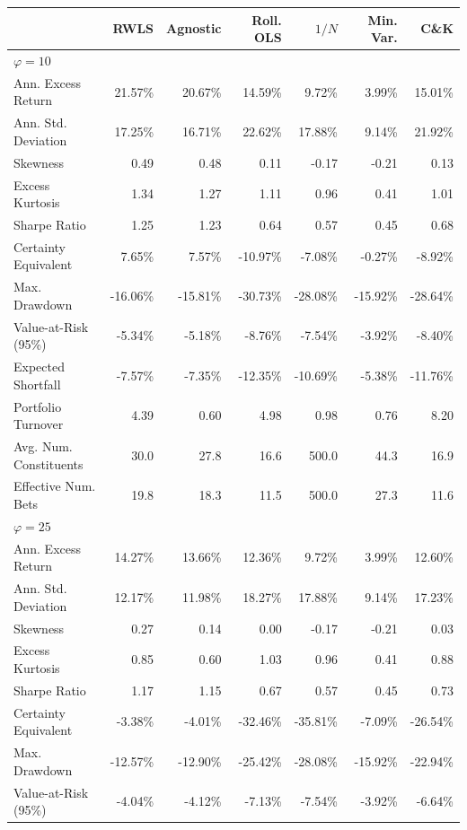 \begin{tabular*}{\textwidth}{l@{\extracolsep{\fill}}rrrrrr}
\toprule
 & RWLS & Agnostic & Roll. OLS & $1/N$ & Min. Var. & C\&K \\
\midrule
\multicolumn{7}{l}{\textit{$\varphi = 10$}} \\
\midrule
Ann. Excess Return & 21.57\% & 20.67\% & 14.59\% & 9.72\% & 3.99\% & 15.01\% \\
Ann. Std. Deviation & 17.25\% & 16.71\% & 22.62\% & 17.88\% & 9.14\% & 21.92\% \\
Skewness & 0.49 & 0.48 & 0.11 & -0.17 & -0.21 & 0.13 \\
Excess Kurtosis & 1.34 & 1.27 & 1.11 & 0.96 & 0.41 & 1.01 \\
Sharpe Ratio & 1.25 & 1.23 & 0.64 & 0.57 & 0.45 & 0.68 \\
Certainty Equivalent & 7.65\% & 7.57\% & -10.97\% & -7.08\% & -0.27\% & -8.92\% \\
Max. Drawdown & -16.06\% & -15.81\% & -30.73\% & -28.08\% & -15.92\% & -28.64\% \\
Value-at-Risk (95\%) & -5.34\% & -5.18\% & -8.76\% & -7.54\% & -3.92\% & -8.40\% \\
Expected Shortfall & -7.57\% & -7.35\% & -12.35\% & -10.69\% & -5.38\% & -11.76\% \\
Portfolio Turnover & 4.39 & 0.60 & 4.98 & 0.98 & 0.76 & 8.20 \\
Avg. Num. Constituents & 30.0 & 27.8 & 16.6 & 500.0 & 44.3 & 16.9 \\
Effective Num. Bets & 19.8 & 18.3 & 11.5 & 500.0 & 27.3 & 11.6 \\
\midrule
\multicolumn{7}{l}{\textit{$\varphi = 25$}} \\
\midrule
Ann. Excess Return & 14.27\% & 13.66\% & 12.36\% & 9.72\% & 3.99\% & 12.60\% \\
Ann. Std. Deviation & 12.17\% & 11.98\% & 18.27\% & 17.88\% & 9.14\% & 17.23\% \\
Skewness & 0.27 & 0.14 & 0.00 & -0.17 & -0.21 & 0.03 \\
Excess Kurtosis & 0.85 & 0.60 & 1.03 & 0.96 & 0.41 & 0.88 \\
Sharpe Ratio & 1.17 & 1.15 & 0.67 & 0.57 & 0.45 & 0.73 \\
Certainty Equivalent & -3.38\% & -4.01\% & -32.46\% & -35.81\% & -7.09\% & -26.54\% \\
Max. Drawdown & -12.57\% & -12.90\% & -25.42\% & -28.08\% & -15.92\% & -22.94\% \\
Value-at-Risk (95\%) & -4.04\% & -4.12\% & -7.13\% & -7.54\% & -3.92\% & -6.64\% \\

\end{tabular*}
